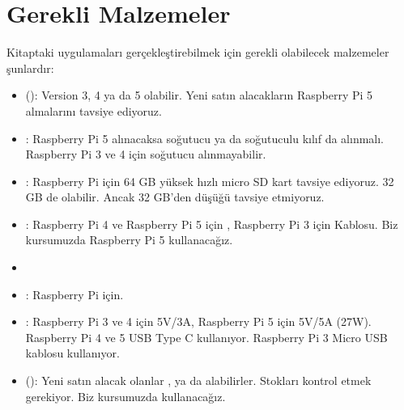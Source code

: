 \documentclass[letterpaper,10pt,turkish]{sphinxmanual}
\begin{document}
\section{Gerekli Malzemeler}
\label{\detokenize{introduction:gerekli-malzemeler}}
\sphinxAtStartPar
Kitaptaki uygulamaları gerçekleştirebilmek için gerekli olabilecek malzemeler şunlardır:
\begin{itemize}
\item {} 
\sphinxAtStartPar
{} (): Version 3, 4 ya da 5 olabilir. Yeni satın alacakların
Raspberry Pi 5 almalarını tavsiye ediyoruz.

\item {} 
\sphinxAtStartPar
{}: Raspberry Pi 5 alınacaksa soğutucu ya da soğutuculu kılıf da alınmalı.
Raspberry Pi 3 ve 4 için soğutucu alınmayabilir.

\item {} 
\sphinxAtStartPar
{}: Raspberry Pi için 64 GB yüksek hızlı micro SD kart tavsiye ediyoruz. 32 GB de
olabilir. Ancak 32 GB’den düşüğü tavsiye etmiyoruz.

\item {} 
\sphinxAtStartPar
{}: Raspberry Pi 4 ve Raspberry Pi 5 için , Raspberry Pi 3
için  Kablosu. Biz kursumuzda Raspberry Pi 5 kullanacağız.

\item {} 
\sphinxAtStartPar
{}

\item {} 
\sphinxAtStartPar
{}: Raspberry Pi için.

\item {} 
\sphinxAtStartPar
{}: Raspberry Pi 3 ve 4 için 5V/3A, Raspberry Pi 5 için 5V/5A (27W).
Raspberry Pi 4 ve 5 USB Type C kullanıyor. Raspberry Pi 3 Micro USB kablosu kullanıyor.

\item {} 
\sphinxAtStartPar
{} (): Yeni satın alacak olanlar ,
 ya da  alabilirler. Stokları kontrol etmek
gerekiyor. Biz kursumuzda  kullanacağız.


\end{itemize}
\end{document}
